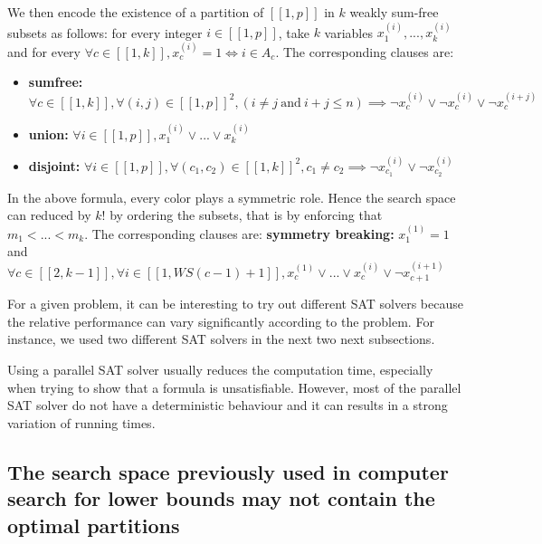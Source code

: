 We then encode the existence of a partition of \([\![1,p]\!]\) in \(k\)  weakly sum-free subsets as follows: for every integer
\(i \in [\![1,p]\!]\), take \(k\) variables \(x^{(i)}_{1}, ..., x^{(i)}_{k}\) and for every \(\forall c \in [\![1,k]\!], x^{(i)}_c = 1 \iff i \in A_c\).
The corresponding clauses are:

\begin{itemize}
\item \textbf{sumfree:} \(\forall c \in  [\![1,k]\!], \forall (i, j) \in [\![1,p]\!]^2, (i \neq j ~ \text{and} ~ i + j \leq n) \implies \lnot x^{(i)}_c
\lor  \lnot x^{(i)}_c \lor \lnot x^{(i+j)}_c\)
\item \textbf{union:} \(\forall i \in [\![1,p]\!], x^{(i)}_1 \lor ... \lor x^{(i)}_k\)
\item \textbf{disjoint:} \(\forall i \in [\![1,p]\!],\forall (c_1, c_2) \in  [\![1,k]\!]^2, c_1 \neq c_2 \implies \neg x^{(i)}_{c_1} \lor \neg x^{(i)}_{c_2}\)
\end{itemize}

In the above formula, every color plays a symmetric role. Hence the search space can reduced by \(k!\) by ordering the subsets, that is by
enforcing that \(m_1 < ... < m_k\). The corresponding clauses are: \linebreak
\textbf{symmetry breaking:}  \(x^{(1)}_1 = 1\) and \(\forall c \in [\![2,k-1]\!], \forall i \in [\![1,WS(c - 1)+1]\!], x^{(1)}_c \lor ... \lor x^{(i)}_c \lor \neg x^{(i+1)}_{c+1}\)

\begin{remark}
For a given problem, it can be interesting to try out different SAT solvers because the relative performance can vary significantly according to the problem.
For instance, we used two different SAT solvers in the next two next subsections.
\end{remark}

\begin{remark}
Using a parallel SAT solver usually reduces the computation time, especially when trying to show that a formula is unsatisfiable. However, most of the 
parallel SAT solver do not have a deterministic behaviour and it can results in a strong variation of running times.
\end{remark}


\subsection{The search space previously used in computer search for lower bounds may not contain the optimal partitions}

